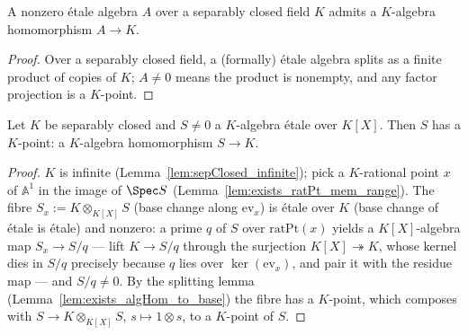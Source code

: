 \begin{lemma}
  \label{lem:exists_algHom_to_base}
  \leanok
  A nonzero \'etale algebra \(A\) over a separably closed field \(K\) admits a \(K\)-algebra
  homomorphism \(A \to K\).
\end{lemma}
\begin{proof}
  \leanok
  Over a separably closed field, a (formally) \'etale algebra splits as a finite product of
  copies of \(K\); \(A \neq 0\) means the product is nonempty, and any factor projection is
  a \(K\)-point.
\end{proof}

\begin{theorem}
  \label{thm:exists_algHom_of_etale_mvPoly}
  \leanok
  Let \(K\) be separably closed and \(S \neq 0\) a \(K\)-algebra \'etale over \(K[X]\).
  Then \(S\) has a \(K\)-point: a \(K\)-algebra homomorphism \(S \to K\).
\end{theorem}
\begin{proof}
  \leanok
  \(K\) is infinite (Lemma~\ref{lem:sepClosed_infinite}); pick a \(K\)-rational point
  \(x\) of \(\mathbb{A}^1\) in the image of \(\Spec S\)
  (Lemma~\ref{lem:exists_ratPt_mem_range}). The fibre
  \(S_x := K \otimes_{K[X]} S\) (base change along \(\mathrm{ev}_x\)) is \'etale over \(K\)
  (base change of \'etale is \'etale) and nonzero: a prime \(q\) of \(S\) over
  \(\mathrm{ratPt}(x)\) yields a \(K[X]\)-algebra map \(S_x \to S/q\) — lift
  \(K \to S/q\) through the surjection \(K[X] \twoheadrightarrow K\), whose kernel dies in
  \(S/q\) precisely because \(q\) lies over \(\ker(\mathrm{ev}_x)\), and pair it with the
  residue map — and \(S/q \neq 0\). By the splitting lemma
  (Lemma~\ref{lem:exists_algHom_to_base}) the fibre has a \(K\)-point, which composes with
  \(S \to K \otimes_{K[X]} S\), \(s \mapsto 1 \otimes s\), to a \(K\)-point of \(S\).
\end{proof}

